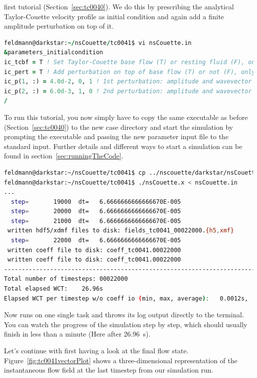 \documentclass[a4paper, 11pt, DIV=11]{scrartcl}
\begin{document}
first tutorial (Section~\ref{sec:tc0040}). We do this by prescribing the analytical
Taylor-Couette velocity profile as initial condition and again add a finite
amplitude perturbation on top of it.
\begin{lstlisting}[language=Fortran]
feldmann@darkstar:~/nsCouette/tc0041$ vi nsCouette.in
&parameters_initialcondition
ic_tcbf = T ! Set Taylor-Couette base flow (T) or resting fluid (F), only when restart = 0
ic_pert = T ! Add perturbation on top of base flow (T) or not (F), only when restart = 0
ic_p(1, :) = 4.0d-2, 0, 1 ! 1st perturbation: amplitude and wavevector (a1, k_th1, k_z1)
ic_p(2, :) = 6.0d-3, 1, 0 ! 2nd perturbation: amplitude and wavevector (a2, k_th2, k_z2)
/
\end{lstlisting}
To run this tutorial, you now simply have to copy the same executable as before
(Section~\ref{sec:tc0040}) to the new case directory and start the simulation by
prompting the executable and passing the new parameter input file to the standard input.
Further details and different ways to start a simulation can be found in
section~\ref{sec:runningTheCode}.
\begin{lstlisting}[language=bash]
feldmann@darkstar:~/nsCouette/tc0041$ cp ../nscouette/darkstar/nsCouette.x .
feldmann@darkstar:~/nsCouette/tc0041$ ./nsCouette.x < nsCouette.in
...
  step=       19000  dt=   6.6666666666666670E-005
  step=       20000  dt=   6.6666666666666670E-005
  step=       21000  dt=   6.6666666666666670E-005
 written hdf5/xdmf files to disk: fields_tc0041_00022000.{h5,xmf}
  step=       22000  dt=   6.6666666666666670E-005
 written coeff file to disk: coeff_tc0041.00022000
 written coeff file to disk: coeff_tc0041.00022000
------------------------------------------------------------------------------------
Total number of timesteps: 00022000
Total elapsed WCT:    26.96s
Elapsed WCT per timestep w/o coeff io (min, max, average):   0.0012s,    0.0012s,    0.0012s
\end{lstlisting}
Now \nsc runs on one single \mpi task and throws its log output directly
to the terminal. You can watch the progress of the simulation step by step,
which should usually finish in less than a minute (Here after \SI{26.96}{\second}).
\par
Let's continue with first having a look at the final flow state.
Figure~\ref{fig:tc0041vectorPlot} shows a three-dimensional representation
of the instantaneous flow field at the last timestep from our simulation run.
\end{document}
